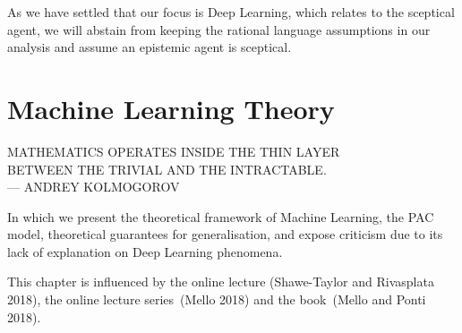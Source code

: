 \documentclass[
  letterpaper,
  12pt,
  british]{tufte-book}
\renewcommand{\textls}[2][5]{%
  \begingroup\addfontfeatures{LetterSpace=#1}#2\endgroup
}
\renewcommand{\allcaps}[1]{\textls[15]{\MakeTextUppercase{#1}}}
\newcommand{\epigraph}[2]{%
  \begin{fullwidth}
  \begin{flushright}
  \sffamily\fontsize{8}{10}\selectfont
  \sffamily\footnotesize
  \begin{doublespace}
  \vspace{-8cm}\noindent\allcaps{#1}\\%
  \noindent\allcaps{#2}\\%
  \end{doublespace}
  \vspace{5.1cm}
  \end{flushright}
  \end{fullwidth}
  \normalfont
}
\renewenvironment{quote}{
  \list{}{\leftmargin=3.5cm\topsep=0pt}
  \item\relax\small\itshape
}
{\endlist}
\theoremstyle{plain}
\theoremstyle{plain}
\theoremstyle{definition}
\theoremstyle{remark}
\begin{document}
As we have settled that our focus is Deep Learning, which relates to the
sceptical agent, we will abstain from keeping the rational language
assumptions in our analysis and assume an epistemic agent is sceptical.

\begin{quote}
\end{quote}

\hypertarget{machine-learning-theory}{%
\chapter{Machine Learning Theory}\label{machine-learning-theory}}

\epigraph{Mathematics operates inside the thin layer \\
    between the trivial and the intractable.}{--- Andrey Kolmogorov}

In which we present the theoretical framework of Machine Learning, the
PAC model, theoretical guarantees for generalisation, and expose
criticism due to its lack of explanation on Deep Learning phenomena.

This chapter is influenced by the online lecture (Shawe-Taylor and
Rivasplata
2018),
the online lecture series~(Mello
2018)
and the book~(Mello and Ponti
2018).
\end{document}
